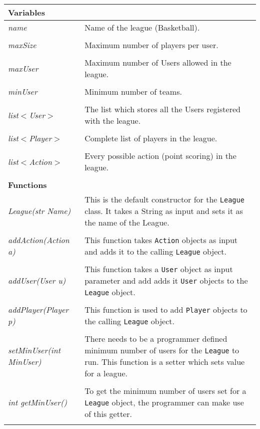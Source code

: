\documentclass[12pt]{report}
\begin{document}
\begin{flushleft}
\begin{singlespace}
\begin{tabular}{ l | p{11cm} }
\hline
\textbf{Variables} & \\
\hline
\textit{name} & Name of the league (Basketball). \\
\\
\textit{maxSize} & Maximum number of players per user. \\
\\
\textit{maxUser} & Maximum number of Users allowed in the league. \\
\\
\textit{minUser} & Minimum number of teams. \\
\\
\textit{list$<$User$>$} & The list which stores all the Users registered with the league. \\
\\
\textit{list$<$Player$>$} & Complete list of players in the league. \\
\\
\textit{list$<$Action$>$} & Every possible action (point scoring) in the league. \\
\\
\hline
\textbf{Functions} & \\
\hline
\textit{League(str Name)} & This is the default constructor for the \texttt{League} class. It takes a String  as input and sets it as the name of the League. \\
\\
\textit{addAction(Action a)} & This function takes \texttt{Action} objects as input and adds it to the calling \texttt{League} object. \\ 
\\
\textit{addUser(User u)} & This function takes a \texttt{User} object as input parameter and add adds it \texttt{User} objects to the \texttt{League} object. \\
\\
\textit{addPlayer(Player p)} & This function is used to add \texttt{Player} objects to the calling \texttt{League} object. \\
\\
\textit{setMinUser(int MinUser)} & There needs to be a programmer defined minimum number of users for the \texttt{League} to run. This function is a setter which sets value for a league. \\
\\
\textit{int getMinUser()} & To get the minimum number of users set for a \texttt{League} object, the programmer can make use of this getter. \\
\\
\end{tabular}
\end{singlespace}
\end{flushleft}
\end{document}
